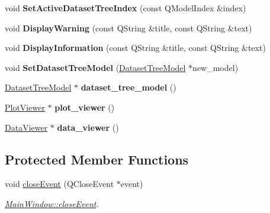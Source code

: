 \begin{DoxyCompactItemize}
\item 
void {\bfseries Set\+Active\+Dataset\+Tree\+Index} (const Q\+Model\+Index \&index)\hypertarget{class_main_window_a332c89f4a6602cb7ad636e99cd4ca904}{}\label{class_main_window_a332c89f4a6602cb7ad636e99cd4ca904}

\item 
void {\bfseries Display\+Warning} (const Q\+String \&title, const Q\+String \&text)\hypertarget{class_main_window_a08e1f9f5f1c62f87192976d0c2315f62}{}\label{class_main_window_a08e1f9f5f1c62f87192976d0c2315f62}

\item 
void {\bfseries Display\+Information} (const Q\+String \&title, const Q\+String \&text)\hypertarget{class_main_window_ac01610888ca042d2298831fac8c7d15c}{}\label{class_main_window_ac01610888ca042d2298831fac8c7d15c}

\item 
void {\bfseries Set\+Dataset\+Tree\+Model} (\hyperlink{class_dataset_tree_model}{Dataset\+Tree\+Model} $\ast$new\+\_\+model)\hypertarget{class_main_window_adf855aa26f97362629196b033612a9d9}{}\label{class_main_window_adf855aa26f97362629196b033612a9d9}

\item 
\hyperlink{class_dataset_tree_model}{Dataset\+Tree\+Model} $\ast$ {\bfseries dataset\+\_\+tree\+\_\+model} ()\hypertarget{class_main_window_a37eb123036ab8ecae87b8456b8315ce2}{}\label{class_main_window_a37eb123036ab8ecae87b8456b8315ce2}

\item 
\hyperlink{class_plot_viewer}{Plot\+Viewer} $\ast$ {\bfseries plot\+\_\+viewer} ()\hypertarget{class_main_window_af51eb931b484f57e1b9f61f8c959e8a5}{}\label{class_main_window_af51eb931b484f57e1b9f61f8c959e8a5}

\item 
\hyperlink{class_data_viewer}{Data\+Viewer} $\ast$ {\bfseries data\+\_\+viewer} ()\hypertarget{class_main_window_aa54a1a3d3c0dbe6c5768eb8fc03edc9c}{}\label{class_main_window_aa54a1a3d3c0dbe6c5768eb8fc03edc9c}

\end{DoxyCompactItemize}
\subsection*{Protected Member Functions}
\begin{DoxyCompactItemize}
\item 
void \hyperlink{class_main_window_a4e20a4a065fbb0e4d3532a45a0a91425}{close\+Event} (Q\+Close\+Event $\ast$event)
\begin{DoxyCompactList}\small\item\em \hyperlink{class_main_window_a4e20a4a065fbb0e4d3532a45a0a91425}{Main\+Window\+::close\+Event}. \end{DoxyCompactList}\end{DoxyCompactItemize}


